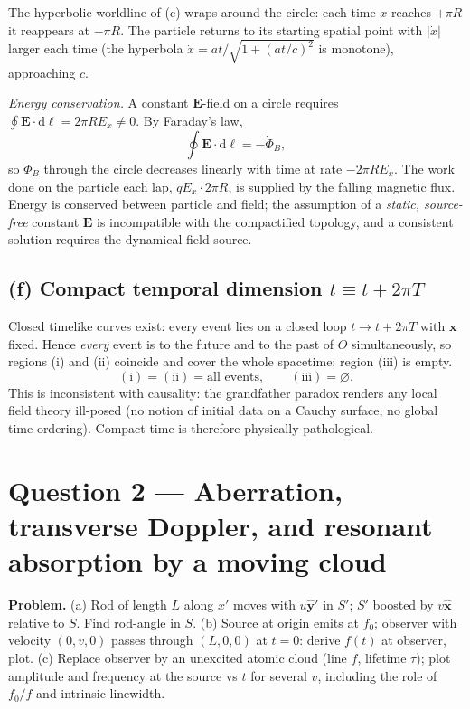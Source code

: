 \documentclass[11pt]{article}
\newcommand{\de}{\mathrm{d}}
\begin{document}
The hyperbolic worldline of (c) wraps around the circle: each time $x$ reaches $+\pi R$ it reappears at $-\pi R$. The particle returns to its starting spatial point with $|\dot x|$ larger each time (the hyperbola $\dot x=at/\sqrt{1+(at/c)^2}$ is monotone), approaching $c$.

\medskip
\noindent\emph{Energy conservation.} A constant $\bm E$-field on a circle requires $\oint\bm E\cdot\de\bm\ell = 2\pi R E_x \neq 0$. By Faraday's law,
\[ \oint\bm E\cdot\de\bm\ell = -\dot\Phi_B, \]
so $\Phi_B$ through the circle decreases linearly with time at rate $-2\pi R E_x$. The work done on the particle each lap, $qE_x\cdot 2\pi R$, is supplied by the falling magnetic flux. Energy is conserved between particle and field; the assumption of a \emph{static, source-free} constant $\bm E$ is incompatible with the compactified topology, and a consistent solution requires the dynamical field source.

\subsection*{(f) Compact temporal dimension $t\equiv t+2\pi T$}

Closed timelike curves exist: every event lies on a closed loop $t\to t+2\pi T$ with $\bm x$ fixed. Hence \emph{every} event is to the future and to the past of $O$ simultaneously, so regions (i) and (ii) coincide and cover the whole spacetime; region (iii) is empty.
\begin{equation}
\boxed{(\text{i})=(\text{ii})=\text{all events},\qquad (\text{iii})=\varnothing.}
\end{equation}
This is inconsistent with causality: the grandfather paradox renders any local field theory ill-posed (no notion of initial data on a Cauchy surface, no global time-ordering). Compact time is therefore physically pathological.

\section*{Question 2 --- Aberration, transverse Doppler, and resonant absorption by a moving cloud}

\textbf{Problem.} (a) Rod of length $L$ along $x'$ moves with $u\hat{\bm y}'$ in $S'$; $S'$ boosted by $v\hat{\bm x}$ relative to $S$. Find rod-angle in $S$. (b) Source at origin emits at $f_0$; observer with velocity $(0,v,0)$ passes through $(L,0,0)$ at $t=0$: derive $f(t)$ at observer, plot. (c) Replace observer by an unexcited atomic cloud (line $f$, lifetime $\tau$); plot amplitude and frequency at the source vs $t$ for several $v$, including the role of $f_0/f$ and intrinsic linewidth.
\end{document}
